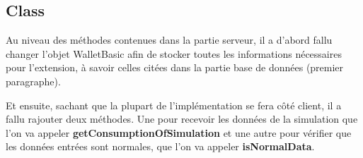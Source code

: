 \subsection{Class}

\begin{flushleft}
Au niveau des méthodes contenues dans la partie serveur, il a d'abord fallu changer l'objet WalletBasic afin de stocker toutes les informations nécessaires pour l'extension, à savoir celles citées dans la partie base de données (premier paragraphe).
\end{flushleft}

\begin{flushleft}
Et ensuite, sachant que la plupart de l'implémentation se fera côté client, il a fallu rajouter deux méthodes. Une pour recevoir les données de la simulation que l'on va appeler \textbf{getConsumptionOfSimulation} et une autre pour vérifier que les données entrées sont normales, que l'on va appeler \textbf{isNormalData}.
\end{flushleft}


